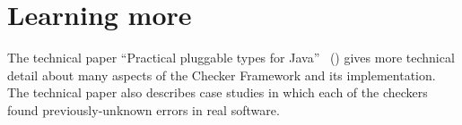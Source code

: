 





% 
% 
% 
% 
% 
% 
% 



\section{Learning more\label{learning-more}}

The technical paper ``Practical pluggable types for Java''~\cite{PapiACPE2008}
()
gives more technical detail about many
aspects of the Checker Framework and its implementation.
%
The technical
paper also describes case
studies in which each of the checkers found
previously-unknown errors in real software.


